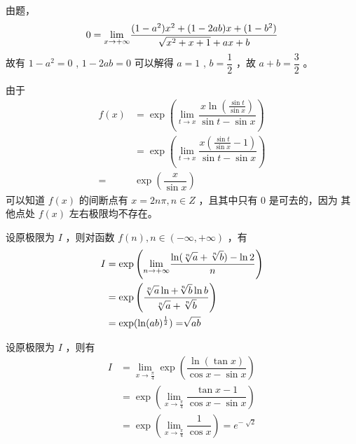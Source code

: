\begin{Answer}
    由题，
    $$
       0 =  {\displaystyle\lim_{x\rightarrow +\infty}} 
       \displaystyle\frac{(1-a^2)x^2+(1-2ab)x+(1-b^2)}{\sqrt{x^2+x+1}+ax+b}
    $$ 
    故有 $ 1-a^2 = 0 $ , $ 1-2ab = 0 $ 
    可以解得 $ a=1 $ , $ b = \dfrac{1}{2} $ ，故 $ a+b=\dfrac{3}{2} $ 。
\end{Answer}

\begin{Answer}
    由于
    \begin{equation*}
        \begin{aligned}
            f(x) &= \exp \left({\displaystyle\lim_{t\rightarrow x}}
            \dfrac{x\ln(\frac{\sin t}{\sin x})}{\sin t-\sin x}\right)\\ 
            &= \exp \left(\lim_{t\rightarrow x}\dfrac{x(\frac{\sin t}{\sin x}-1)}{\sin t-\sin x}\right)\\ 
            =& \exp(\dfrac{x}{\sin x})
        \end{aligned}
    \end{equation*}
    可以知道 $ f(x) $ 的间断点有 $ x = 2n\pi, n\in Z $ ，且其中只有 $ 0 $ 是可去的，因为
    其他点处 $ f(x) $ 左右极限均不存在。
\end{Answer}

\begin{Answer}[不要认为令 $ a = b = 1 $ 的结果一定能代表答案\getback{T4}]
    设原极限为 $ I $ ，则对函数 $ f(n),n\in (-\infty,+\infty) $ ，有
    \begin{equation*}
        \begin{aligned}
            I &= \exp \left({\displaystyle\lim_{n\rightarrow +\infty}}
            \dfrac{\ln(\displaystyle\sqrt[n]{a}+\displaystyle\sqrt[n]{b})-\ln 2}{n} \right)\\ &=
            \exp\left(\dfrac{\displaystyle\sqrt[n]{a}\ln+\displaystyle\sqrt[n]{b}\ln b}{\displaystyle\sqrt[n]{a}+\displaystyle\sqrt[n]{b}}\right)
            \\&= \exp(\ln (ab)^\frac{1}{2}) = \displaystyle\sqrt[]{ab}
        \end{aligned}
    \end{equation*}
\end{Answer}

\begin{Answer}
    设原极限为 $ I $ ，则有
    \begin{equation*}
        \begin{aligned}
            I &= {\displaystyle\lim_{x\rightarrow \frac{\pi}{4}}}\exp\left(\dfrac{\ln (\tan x)}
            {\cos x - \sin x}\right) \\&= \exp\left({\displaystyle\lim_{x\rightarrow \frac{\pi}{4}}}
            \dfrac{\tan x - 1}{\cos x - \sin x}\right) \\&=
            \exp({\displaystyle\lim_{x\rightarrow \frac{\pi}{4}}} \dfrac{1}{\cos x}) = e^{-\sqrt[]{2}}
        \end{aligned}
    \end{equation*}
\end{Answer}

